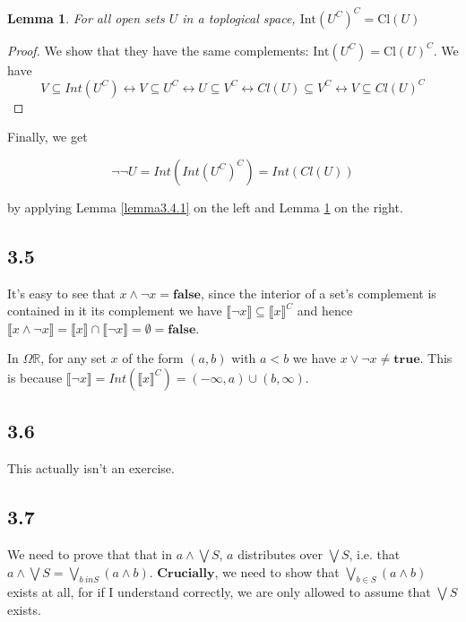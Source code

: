 \documentclass{article}
\newtheorem{lemma}{Lemma}
\newcommand{\mbf}{\mathbf}
\newcommand{\sem}[1]{\llbracket #1 \rrbracket}
\begin{document}
\begin{lemma}
For all open sets $U$ in a toplogical space, $\text{Int}(U^C)^C = \text{Cl}(U)$
\label{lemma3.4.2}
\end{lemma}

\begin{proof}
We show that they have the same complements: $\text{Int}(U^C) = \text{Cl}(U)^C$.
We have $$V \subseteq \mathit{Int}(U^C) \leftrightarrow V \subseteq U^C \leftrightarrow U \subseteq V^C \leftrightarrow \mathit{Cl}(U) \subseteq V^C  \leftrightarrow V \subseteq \mathit{Cl}(U)^C$$

\end{proof}

Finally, we get

$$\neg \neg U = \mathit{Int}( \mathit{Int}(U^C)^C) = \mathit{Int}( \mathit{Cl}(U) ) $$

by applying Lemma \ref{lemma3.4.1} on the left and Lemma \ref{lemma3.4.2} on the right.

\subsection*{3.5}

It's easy to see that $x \wedge \neg x = \mbf{false}$, since the interior of a set's complement is contained
in it its complement we have $\sem{\neg x} \subseteq \sem{x}^C$ and hence $\sem{x \wedge \neg x} = \sem{x} \cap \sem{\neg x} = \emptyset = \mbf{false}$.

In $\Omega \mathbb R$, for any set $x$ of the form $(a,b)$ with $a < b$ we have $x \vee \neg x \neq \mbf{true}$. 
This is because $\sem{\neg x} = \mathit{Int}(\sem{x}^C) = (-\infty,a) \cup (b, \infty)$.

\subsection*{3.6}

This actually isn't an exercise.

\subsection*{3.7}

We need to prove that that in $a \wedge \bigvee S$, $a$ distributes over $\bigvee S$, i.e. that $a \wedge \bigvee S = \bigvee_{b \ in S} (a \wedge b)$. $\mbf{Crucially}$, we need to show that $\bigvee_{b \in S} (a \wedge b)$ exists at all, for if I understand correctly, we are only allowed to assume that $\bigvee S$ exists.
\end{document}
